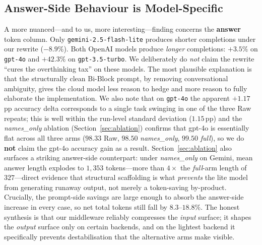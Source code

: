 \documentclass[11pt,a4paper,twocolumn]{article}
\begin{document}
\subsection{Answer-Side Behaviour is Model-Specific}
\label{sec:answer-side}
A more nuanced---and to us, more interesting---finding concerns the \textbf{answer} token column. Only \texttt{gemini-2.5-flash-lite} produces shorter completions under our rewrite ($-8.9\%$). Both OpenAI models produce \textit{longer} completions: $+3.5\%$ on \texttt{gpt-4o} and $+42.3\%$ on \texttt{gpt-3.5-turbo}. We deliberately do \textit{not} claim the rewrite ``cures the overthinking tax'' on these models. The most plausible explanation is that the structurally clean Bi-Block prompt, by removing conversational ambiguity, gives the cloud model less reason to hedge and more reason to fully elaborate the implementation. We also note that on \texttt{gpt-4o} the apparent $+1.17$\,pp accuracy delta corresponds to a single task swinging in one of the three Raw repeats; this is well within the run-level standard deviation ($1.15$\,pp) and the \textit{names\_only} ablation (Section~\ref{sec:ablation}) confirms that gpt-4o is essentially flat across all three arms ($98.33$ Raw, $98.50$ \textit{names\_only}, $99.50$ \textit{full}), so we do \textbf{not} claim the gpt-4o accuracy gain as a result. Section~\ref{sec:ablation} also surfaces a striking answer-side counterpart: under \textit{names\_only} on Gemini, mean answer length explodes to $1{,}353$ tokens---more than $4\times$ the \textit{full}-arm length of $327$---direct evidence that structural scaffolding is what \emph{prevents} the lite model from generating runaway output, not merely a token-saving by-product. Crucially, the prompt-side savings are large enough to absorb the answer-side increase in every case, so net total tokens still fall by $8.3$--$18.8\%$. The honest synthesis is that our middleware reliably compresses the \emph{input} surface; it shapes the \emph{output} surface only on certain backends, and on the lightest backend it specifically prevents destabilisation that the alternative arms make visible.
\end{document}
